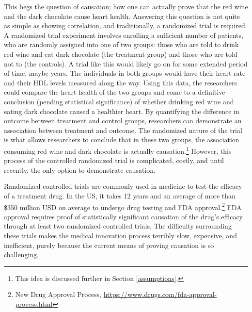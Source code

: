 This begs the question of causation; how one can actually prove that the red wine and the dark chocolate cause heart health.  Answering this question is not quite as simple as showing correlation, and traditionally, a randomized trial is required.  A randomized trial experiment involves enrolling a sufficient number of patients, who are randomly assigned into one of two groups: those who are told to drink red wine and eat dark chocolate (the treatment group) and those who are told not to (the controls).  A trial like this would likely go on for some extended period of time, maybe years.  The individuals in both groups would have their heart rate and their HDL levels measured along the way.  Using this data, the researchers could compare the heart health of the two groups and come to a definitive conclusion (pending statistical significance) of whether drinking red wine and eating dark chocolate caused a healthier heart.  By quantifying the difference in outcome between treatment and control groups, researchers can demonstrate an association between treatment and outcome.  The randomized nature of the trial is what allows researchers to conclude that in these two groups, the association consuming red wine and dark chocolate is actually causation.\footnote{This idea is discussed further in Section \ref{assumptions}.} However, this process of the controlled randomized trial is complicated, costly, and until recently, the only option to demonstrate causation.  
 
Randomized controlled trials are commonly used in medicine to test the efficacy of a treatment drug.  In the US, it takes 12 years and an average of more than \$350 million USD on average to undergo drug testing and FDA approval.\footnote{New Drug Approval Process, \url{https://www.drugs.com/fda-approval-process.html}}  FDA approval requires proof of statistically significant causation of the drug's efficacy through at least two randomized controlled trials.  The difficulty surrounding these trials makes the medical innovation process terribly slow, expensive, and inefficient, purely because the current means of proving causation is so challenging.  
 
